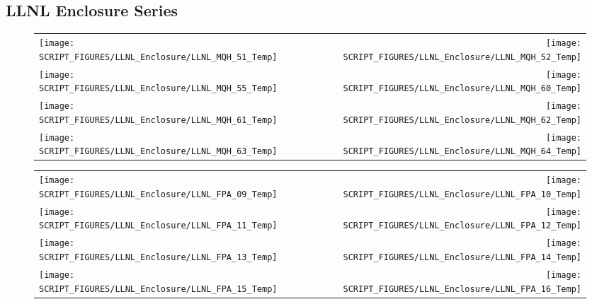 \clearpage

\subsection{LLNL Enclosure Series}

\begin{figure}[!ht]
\begin{tabular*}{\textwidth}{l@{\extracolsep{\fill}}r}
\texttt{[image: SCRIPT\_FIGURES/LLNL\_Enclosure/LLNL\_MQH\_51\_Temp]} &
\texttt{[image: SCRIPT\_FIGURES/LLNL\_Enclosure/LLNL\_MQH\_52\_Temp]} \\
\texttt{[image: SCRIPT\_FIGURES/LLNL\_Enclosure/LLNL\_MQH\_55\_Temp]} &
\texttt{[image: SCRIPT\_FIGURES/LLNL\_Enclosure/LLNL\_MQH\_60\_Temp]} \\
\texttt{[image: SCRIPT\_FIGURES/LLNL\_Enclosure/LLNL\_MQH\_61\_Temp]} &
\texttt{[image: SCRIPT\_FIGURES/LLNL\_Enclosure/LLNL\_MQH\_62\_Temp]} \\
\texttt{[image: SCRIPT\_FIGURES/LLNL\_Enclosure/LLNL\_MQH\_63\_Temp]} &
\texttt{[image: SCRIPT\_FIGURES/LLNL\_Enclosure/LLNL\_MQH\_64\_Temp]}
\end{tabular*}
\end{figure}

\begin{figure}[!ht]
\begin{tabular*}{\textwidth}{l@{\extracolsep{\fill}}r}
\texttt{[image: SCRIPT\_FIGURES/LLNL\_Enclosure/LLNL\_FPA\_09\_Temp]} &
\texttt{[image: SCRIPT\_FIGURES/LLNL\_Enclosure/LLNL\_FPA\_10\_Temp]} \\
\texttt{[image: SCRIPT\_FIGURES/LLNL\_Enclosure/LLNL\_FPA\_11\_Temp]} &
\texttt{[image: SCRIPT\_FIGURES/LLNL\_Enclosure/LLNL\_FPA\_12\_Temp]} \\
\texttt{[image: SCRIPT\_FIGURES/LLNL\_Enclosure/LLNL\_FPA\_13\_Temp]} &
\texttt{[image: SCRIPT\_FIGURES/LLNL\_Enclosure/LLNL\_FPA\_14\_Temp]} \\
\texttt{[image: SCRIPT\_FIGURES/LLNL\_Enclosure/LLNL\_FPA\_15\_Temp]} &
\texttt{[image: SCRIPT\_FIGURES/LLNL\_Enclosure/LLNL\_FPA\_16\_Temp]}
\end{tabular*}
\end{figure}

